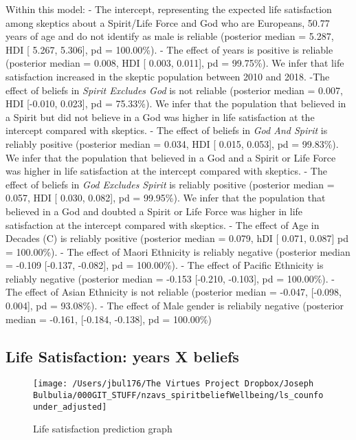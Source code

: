 \documentclass[
  english,
  man,floatsintext]{apa6}
\begin{document}
Within this model:
- The intercept, representing the expected life satisfaction among skeptics about a Spirit/Life Force and God who are Europeans, 50.77 years of age and do not identify as male is reliable (posterior median = 5.287, HDI {[} 5.267, 5.306{]}, pd = 100.00\%).
- The effect of years is positive is reliable (posterior median = 0.008, HDI {[} 0.003, 0.011{]}, pd = 99.75\%). We infer that life satisfaction increased in the skeptic population between 2010 and 2018.
-The effect of beliefs in \emph{Spirit Excludes God} is not reliable (posterior median = 0.007, HDI {[}-0.010, 0.023{]}, pd = 75.33\%). We infer that the population that believed in a Spirit but did not believe in a God was higher in life satisfaction at the intercept compared with skeptics.
- The effect of beliefs in \emph{God And Spirit} is reliably positive (posterior median = 0.034, HDI {[} 0.015, 0.053{]}, pd = 99.83\%). We infer that the population that believed in a God and a Spirit or Life Force was higher in life satisfaction at the intercept compared with skeptics.
- The effect of beliefs in \emph{God Excludes Spirit} is reliably positive (posterior median = 0.057, HDI {[} 0.030, 0.082{]}, pd = 99.95\%). We infer that the population that believed in a God and doubted a Spirit or Life Force was higher in life satisfaction at the intercept compared with skeptics.
- The effect of Age in Decades (C) is reliably positive (posterior median = 0.079, hDI {[} 0.071, 0.087{]} pd = 100.00\%).
- The effect of Maori Ethnicity is reliably negative (posterior median = -0.109 \textbar{} {[}-0.137, -0.082{]}, pd = 100.00\%).
- The effect of Pacific Ethnicity is reliably negative (posterior median = -0.153 \textbar{} {[}-0.210, -0.103{]}, pd = 100.00\%).
- The effect of Asian Ethnicity is not reliable (posterior median = -0.047, {[}-0.098, 0.004{]}, pd = 93.08\%).
- The effect of Male gender is reliabily negative (posterior median = -0.161, {[}-0.184, -0.138{]}, pd = 100.00\%)

\hypertarget{life-satisfaction-years-x-beliefs}{%
\subsection{Life Satisfaction: years X beliefs}\label{life-satisfaction-years-x-beliefs}}

\begin{figure}
\texttt{[image: /Users/jbul176/The Virtues Project Dropbox/Joseph Bulbulia/000GIT\_STUFF/nzavs\_spiritbeliefWellbeing/ls\_counfounder\_adjusted]} \caption{Life satisfaction prediction graph}\label{fig:unnamed-chunk-3}
\end{figure}
\end{document}
